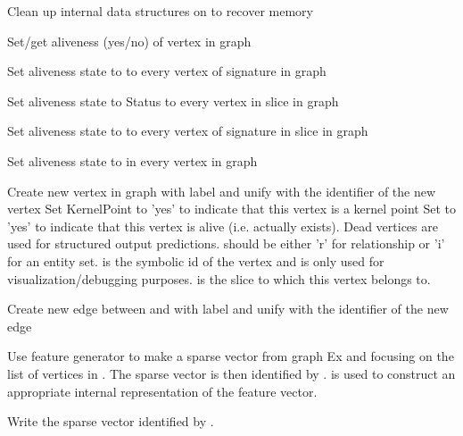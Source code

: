 \begin{description}
Clean up internal data structures on  to recover memory

Set/get aliveness  (yes/no) of vertex  in graph 

Set aliveness state to  to every vertex of signature  in graph 

Set aliveness state to Status to every vertex in slice  in graph 

Set aliveness state to  to every vertex of signature  in
slice  in graph 

Set aliveness state to  in every vertex in graph 

Create new vertex in graph  with label  and unify  with
the identifier of the new vertex Set KernelPoint to 'yes' to
indicate that this vertex is a kernel point Set  to 'yes'
to indicate that this vertex is alive (i.e. actually exists). Dead
vertices are used for structured output predictions.  should
be either 'r' for relationship or 'i' for an entity set.  is
the symbolic id of the vertex and is only used for
visualization/debugging purposes.  is the slice to which
this vertex belongs to.

Create new edge between  and  with label  and unify  with
the identifier of the new edge

Use feature generator  to make a sparse vector from graph Ex and
focusing on the list of vertices in . The sparse vector
is then identified by .  is used to construct an
appropriate internal representation of the feature vector.

Write the sparse vector identified by .


\end{description}
